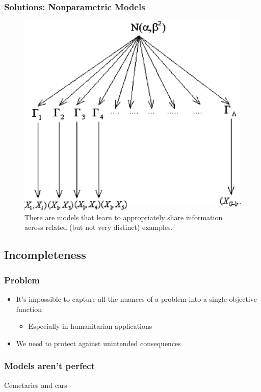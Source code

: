 \documentclass[10pt,mathserif]{beamer}
\begin{document}
\begin{frame}[]
  \frametitle{Solutions: Nonparametric Models}
  \begin{figure}[ht]
    \centering
    \includegraphics[options]{figures/indian_buffet}
    \caption{There are models that learn to appropriately share information
      across related (but not very distinct) examples. \label{fig:label} }
\end{figure}
\end{frame}

\subsection{Incompleteness}
\label{subsec:label}

\begin{frame}
  \frametitle{Problem}
  \begin{itemize}
  \item It's impossible to capture all the nuances of a problem into a single
    objective function
    \begin{itemize}
    \item Especially in humanitarian applications
    \end{itemize}
  \item We need to protect against unintended consequences
  \end{itemize}
\end{frame}

\begin{frame}
  \frametitle{Models aren't perfect}
 Cemetaries and cars 
\end{frame}
\end{document}
